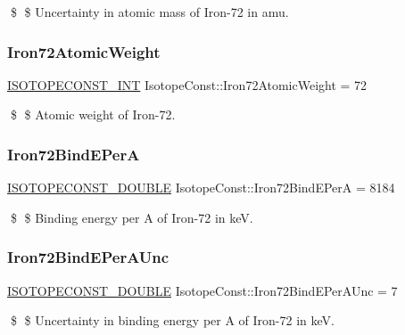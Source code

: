\$ \$ Uncertainty in atomic mass of Iron-\/72 in amu. \mbox{\label{group___isotope_const-_iron-_fe72_ga50d546f4342b2d47d1911cb5945d718d}} 
\subsubsection{\texorpdfstring{Iron72\+Atomic\+Weight}{Iron72AtomicWeight}}
{\footnotesize\ttfamily \mbox{\hyperlink{group___isotope_const-_macros_ga5f18360b3e99483a35c32d789e62621c}{I\+S\+O\+T\+O\+P\+E\+C\+O\+N\+S\+T\+\_\+\+I\+NT}} Isotope\+Const\+::\+Iron72\+Atomic\+Weight = 72}

\$ \$ Atomic weight of Iron-\/72. \mbox{\label{group___isotope_const-_iron-_fe72_gaf1a5ca426ec55e887f628739df74af93}} 
\subsubsection{\texorpdfstring{Iron72\+Bind\+E\+PerA}{Iron72BindEPerA}}
{\footnotesize\ttfamily \mbox{\hyperlink{group___isotope_const-_macros_ga8f45a7272ce02c0b4c65c44636ed719a}{I\+S\+O\+T\+O\+P\+E\+C\+O\+N\+S\+T\+\_\+\+D\+O\+U\+B\+LE}} Isotope\+Const\+::\+Iron72\+Bind\+E\+PerA = 8184}

\$ \$ Binding energy per A of Iron-\/72 in keV. \mbox{\label{group___isotope_const-_iron-_fe72_gac0c36d089e573e3a0c21c5e5ce4e62c9}} 
\subsubsection{\texorpdfstring{Iron72\+Bind\+E\+Per\+A\+Unc}{Iron72BindEPerAUnc}}
{\footnotesize\ttfamily \mbox{\hyperlink{group___isotope_const-_macros_ga8f45a7272ce02c0b4c65c44636ed719a}{I\+S\+O\+T\+O\+P\+E\+C\+O\+N\+S\+T\+\_\+\+D\+O\+U\+B\+LE}} Isotope\+Const\+::\+Iron72\+Bind\+E\+Per\+A\+Unc = 7}

\$ \$ Uncertainty in binding energy per A of Iron-\/72 in keV. \mbox{\label{group___isotope_const-_iron-_fe72_ga26eff95f9624679a32607e19f3eac6fc}} 
